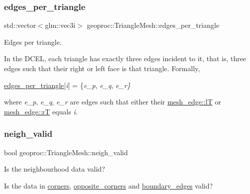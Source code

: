 \subsubsection{\texorpdfstring{edges\+\_\+per\+\_\+triangle}{edges\_per\_triangle}}
{\footnotesize\ttfamily std\+::vector$<$glm\+::vec3i$>$ geoproc\+::\+Triangle\+Mesh\+::edges\+\_\+per\+\_\+triangle\hspace{0.3cm}{\ttfamily [protected]}}



Edges per triangle. 

In the D\+C\+EL, each triangle has exactly three edges incident to it, that is, three edges such that their right or left face is that triangle. Formally,

\hyperlink{classgeoproc_1_1TriangleMesh_abd4a23d389a000a75666afad50387a6f}{edges\+\_\+per\+\_\+triangle}\mbox{[}{\itshape i}\mbox{]} = \{{\itshape e\+\_\+p}, {\itshape e\+\_\+q}, {\itshape e\+\_\+r\}} 

where {\itshape e\+\_\+p}, {\itshape e\+\_\+q}, {\itshape e\+\_\+r} are edges such that either their \hyperlink{classgeoproc_1_1mesh__edge_a348d06b420ce1588be1bc7eac781c6ef}{mesh\+\_\+edge\+::lT} or \hyperlink{classgeoproc_1_1mesh__edge_af19f02d3f6c36f2b23afa581c8ae3f59}{mesh\+\_\+edge\+::rT} equals {\itshape i}. \mbox{\label{classgeoproc_1_1TriangleMesh_a21205ec88e494f864db4d8247db70d3c}} 
\subsubsection{\texorpdfstring{neigh\+\_\+valid}{neigh\_valid}}
{\footnotesize\ttfamily bool geoproc\+::\+Triangle\+Mesh\+::neigh\+\_\+valid\hspace{0.3cm}{\ttfamily [protected]}}



Is the neighbourhood data valid? 

Is the data in \hyperlink{classgeoproc_1_1TriangleMesh_ab9610d614e081deb28010d237fecd55b}{corners}, \hyperlink{classgeoproc_1_1TriangleMesh_a2604795c90c694116513252b86d242b4}{opposite\+\_\+corners} and \hyperlink{classgeoproc_1_1TriangleMesh_a142a764ddf07b98c7efcd596d88c3f87}{boundary\+\_\+edges} valid? \mbox{\label{classgeoproc_1_1TriangleMesh_a9fa270e81bcf0b9acf03696d9d0c9264}} 
